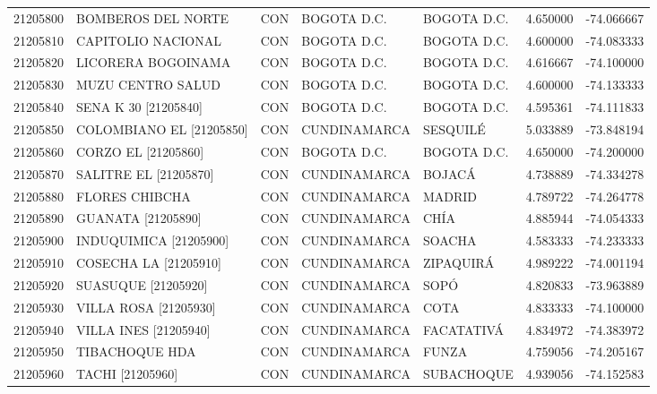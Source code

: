 \begin{longtable}{rllllrr}
 21205800 &          BOMBEROS DEL NORTE &  CON &      BOGOTA D.C. &       BOGOTA D.C. &  4.650000 & -74.066667 \\
 21205810 &          CAPITOLIO NACIONAL &  CON &      BOGOTA D.C. &       BOGOTA D.C. &  4.600000 & -74.083333 \\
 21205820 &          LICORERA BOGOINAMA &  CON &      BOGOTA D.C. &       BOGOTA D.C. &  4.616667 & -74.100000 \\
 21205830 &           MUZU CENTRO SALUD &  CON &      BOGOTA D.C. &       BOGOTA D.C. &  4.600000 & -74.133333 \\
 21205840 &        SENA K 30 [21205840] &  CON &      BOGOTA D.C. &       BOGOTA D.C. &  4.595361 & -74.111833 \\
 21205850 &    COLOMBIANO EL [21205850] &  CON &     CUNDINAMARCA &          SESQUILÉ &  5.033889 & -73.848194 \\
 21205860 &         CORZO EL [21205860] &  CON &      BOGOTA D.C. &       BOGOTA D.C. &  4.650000 & -74.200000 \\
 21205870 &       SALITRE EL [21205870] &  CON &     CUNDINAMARCA &            BOJACÁ &  4.738889 & -74.334278 \\
 21205880 &              FLORES CHIBCHA &  CON &     CUNDINAMARCA &            MADRID &  4.789722 & -74.264778 \\
 21205890 &          GUANATA [21205890] &  CON &     CUNDINAMARCA &              CHÍA &  4.885944 & -74.054333 \\
 21205900 &      INDUQUIMICA [21205900] &  CON &     CUNDINAMARCA &            SOACHA &  4.583333 & -74.233333 \\
 21205910 &       COSECHA LA [21205910] &  CON &     CUNDINAMARCA &         ZIPAQUIRÁ &  4.989222 & -74.001194 \\
 21205920 &      SUASUQUE    [21205920] &  CON &     CUNDINAMARCA &              SOPÓ &  4.820833 & -73.963889 \\
 21205930 &       VILLA ROSA [21205930] &  CON &     CUNDINAMARCA &              COTA &  4.833333 & -74.100000 \\
 21205940 &       VILLA INES [21205940] &  CON &     CUNDINAMARCA &        FACATATIVÁ &  4.834972 & -74.383972 \\
 21205950 &              TIBACHOQUE HDA &  CON &     CUNDINAMARCA &             FUNZA &  4.759056 & -74.205167 \\
 21205960 &            TACHI [21205960] &  CON &     CUNDINAMARCA &        SUBACHOQUE &  4.939056 & -74.152583 \\

\end{longtable}
